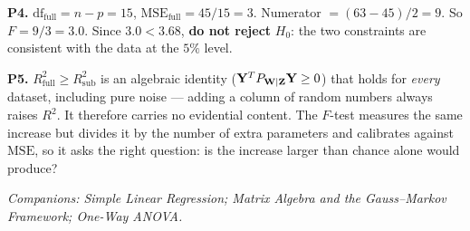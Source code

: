 \documentclass[11pt]{article}
\begin{document}
\smallskip\noindent\textbf{P4.} $\mathrm{df}_{\text{full}}=n-p=15$,
$\mathrm{MSE}_{\text{full}}=45/15=3$. Numerator $=(63-45)/2=9$. So $F=9/3=3.0$. Since
$3.0<3.68$, \textbf{do not reject} $H_0$: the two constraints are consistent with the data at
the $5\%$ level.

\smallskip\noindent\textbf{P5.} $R^2_{\text{full}}\ge R^2_{\text{sub}}$ is an algebraic
identity ($\mathbf{Y}^TP_{\mathbf{W}\mid\mathbf{Z}}\mathbf{Y}\ge0$) that holds for \emph{every} dataset, including pure
noise --- adding a column of random numbers always raises $R^2$. It therefore carries no
evidential content. The $F$-test measures the same increase but divides it by the number of
extra parameters and calibrates against $\mathrm{MSE}$, so it asks the right question: is the
increase larger than chance alone would produce?

\vfill
\begin{center}\small\itshape
Companions: Simple Linear Regression;
Matrix Algebra and the Gauss--Markov Framework; One-Way ANOVA.
\end{center}
\end{document}
